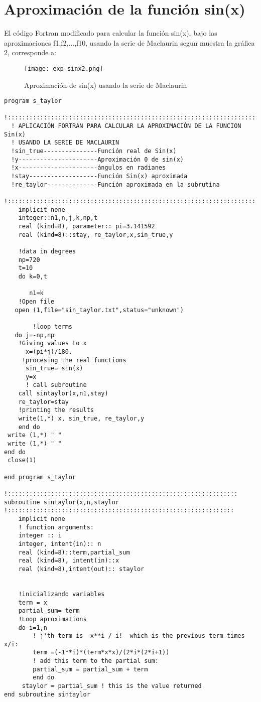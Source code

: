 \documentclass[12pt,a4paper,twoside]{article}
\begin{document}
\section{Aproximación de la función sin(x)}
El código Fortran modificado para calcular la función sin(x), bajo las aproximaciones f1,f2,...,f10, usando la serie de Maclaurin segun muestra la gráfica 2, corresponde a:
\begin{figure}[htbp]
\centering
\texttt{[image: exp\_sinx2.png]}
\caption{Aproximación de sin(x) usando la serie de Maclaurin}\label{fig:figura2}
\end{figure}
\begin{verbatim}
program s_taylor
  !::::::::::::::::::::::::::::::::::::::::::::::::::::::::::::::::::::::
  ! APLICACIÓN FORTRAN PARA CALCULAR LA APROXIMACIÓN DE LA FUNCION Sin(x)
  ! USANDO LA SERIE DE MACLAURIN
  !sin_true---------------Función real de Sin(x)
  !y----------------------Aproximación 0 de sin(x)
  !x----------------------ángulos en radianes
  !stay-------------------Función Sin(x) aproximada
  !re_taylor--------------Función aproximada en la subrutina
  !:::::::::::::::::::::::::::::::::::::::::::::::::::::::::::::::::::::
    implicit none                  
    integer::n1,n,j,k,np,t
    real (kind=8), parameter:: pi=3.141592
    real (kind=8)::stay, re_taylor,x,sin_true,y
   
    !data in degrees
    np=720
    t=10
    do k=0,t

       n1=k
    !Open file
   open (1,file="sin_taylor.txt",status="unknown") 
  
        !loop terms
   do j=-np,np 
    !Giving values to x
      x=(pi*j)/180.
     !procesing the real functions
      sin_true= sin(x)
      y=x
      ! call subroutine
    call sintaylor(x,n1,stay)
    re_taylor=stay
    !printing the results
    write(1,*) x, sin_true, re_taylor,y
    end do
 write (1,*) " "
 write (1,*) " "
end do 
 close(1)
 
end program s_taylor

!::::::::::::::::::::::::::::::::::::::::::::::::::::::::::::::::
subroutine sintaylor(x,n,staylor
!:::::::::::::::::::::::::::::::::::::::::::::::::::::::::::::::
    implicit none
    ! function arguments:
    integer :: i
    integer, intent(in):: n
    real (kind=8)::term,partial_sum
    real (kind=8), intent(in)::x
    real (kind=8),intent(out):: staylor
    
  
    !inicializando variables
    term = x
    partial_sum= term
    !Loop aproximations
    do i=1,n
        ! j'th term is  x**i / i!  which is the previous term times x/i:
        term =(-1**i)*(term*x*x)/(2*i*(2*i+1))  
        ! add this term to the partial sum:
        partial_sum = partial_sum + term   
        end do
     staylor = partial_sum ! this is the value returned
end subroutine sintaylor
\end{verbatim}
\end{document}
